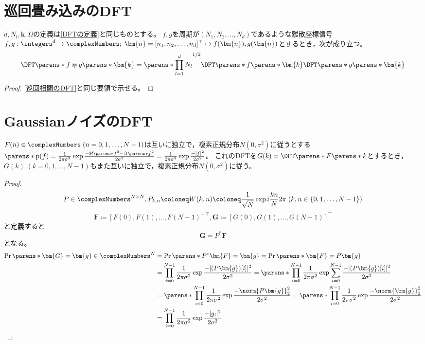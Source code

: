     \section{巡回畳み込みのDFT}
        \begin{shadebox}
            $d,N_l,\bm{k},\Omega$の定義は\ref{DFTの定義}と同じものとする。
            $f,g$を周期が$(N_1,N_2,\dots,N_d)$であるような離散座標信号$f,g: \integers^d\to\complexNumbers;\;\bm{n} = [n_1,n_2,\dots,n_d]^\top \mapsto f(\bm{n}),g(\bm{n})$とするとき，次が成り立つ。
            \[ \DFT\parens*{f\circledast g}\parens*{\bm{k}} = \parens*{\prod_{l=1}^d N_l}^{1/2}\DFT\parens*{f}\parens*{\bm{k}}\DFT\parens*{g}\parens*{\bm{k}} \]
        \end{shadebox}
        \begin{proof}
            \ref{巡回相関のDFT}と同じ要領で示せる。
        \end{proof}
    \section{GaussianノイズのDFT}
        \begin{shadebox}
            $F(n) \in \complexNumbers\;(n=0,1,\dots,N-1)$は互いに独立で，複素正規分布$N(0,\sigma^2)$に従うとする$\parens*{\text{p}(f) = \frac{1}{2\pi\sigma^2}\exp\frac{-\Re\parens*{f}^2-\Im\parens*{f}^2}{2\sigma^2} = \frac{1}{2\pi\sigma^2}\exp\frac{-|f|^2}{2\sigma^2}}$。
            これのDFTを$G(k) = \DFT\parens*{F}\parens*{k}$とするとき，$G(k)\;(k=0,1,\dots,N-1)$もまた互いに独立で，複素正規分布$N(0,\sigma^2)$に従う。
        \end{shadebox}
        \begin{proof}
            \[ P \in \complexNumbers^{N\times N}, P_{k,n} \coloneq W(k,n) \coloneq \frac{1}{\sqrt{N}}\exp i\frac{kn}{N}2\pi\;(k,n \in \{0,1,\dots,N-1\}) \]
            \[ \bm{F} \coloneq [F(0), F(1), \dots, F(N-1)]^\top,\bm{G} \coloneq [G(0), G(1), \dots, G(N-1)]^\top \]
            と定義すると
            \[ \bm{G} = P^*\bm{F} \]
            となる。
            \begin{align*}
                \Pr\parens*{\bm{G} = \bm{g} \in \complexNumbers^N} &= \Pr\parens*{P^*\bm{F} = \bm{g}} = \Pr\parens*{\bm{F} = P\bm{g}} \\
                &= \prod_{i=0}^{N-1}\frac{1}{2\pi\sigma^2} \exp\frac{-|(P\bm{g})[i]|^2}{2\sigma^2} = \parens*{\prod_{i=0}^{N-1}\frac{1}{2\pi\sigma^2}} \exp \sum_{i=0}^{N-1} \frac{-|(P\bm{g})[i]|^2}{2\sigma^2} \\
                &= \parens*{\prod_{i=0}^{N-1}\frac{1}{2\pi\sigma^2}} \exp \frac{-\norm{P\bm{g}}_2^2}{2\sigma^2} = \parens*{\prod_{i=0}^{N-1}\frac{1}{2\pi\sigma^2}} \exp \frac{-\norm{\bm{g}}_2^2}{2\sigma^2} \\
                &= \prod_{i=0}^{N-1}\frac{1}{2\pi\sigma^2} \exp \frac{-|g_i|^2}{2\sigma^2}
            \end{align*}
        \end{proof}
